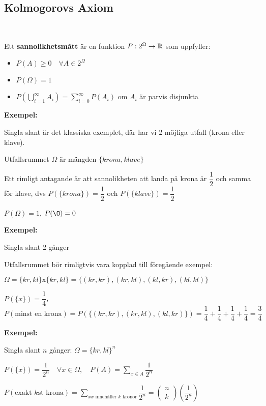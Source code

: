 \subsection{Kolmogorovs Axiom}\hfill\\
\par
\noindent Ett \textbf{sannolikhetsmått} är en funktion $P:2^{\Omega}\to\mathbb{R}$ som uppfyller:
\begin{itemize}
  \item $P(A)\geq0\quad \forall A\in2^{\Omega}$
  \item $P(\Omega) = 1$
  \item $P\left(\bigcup_{i=1}^{\infty}A_i\right) = \sum_{i=0}^{\infty}P(A_i)$ om $A_i$ är parvis disjunkta
\end{itemize}
\par\bigskip
\noindent\textbf{Exempel:}
\par\bigskip
\noindent Singla slant är det klassiska exemplet, där har vi 2 möjliga utfall (krona eller klave).\par
\noindent Utfallsrummet $\Omega$ är mängden $\{krona, klave\}$\par
\noindent Ett rimligt antagande är att sannolikheten att landa på krona är $\dfrac{1}{2}$ och samma för klave, dvs $P(\{krona\}) = \dfrac{1}{2}$ och $P(\{klave\}) = \dfrac{1}{2}$\par\bigskip
\noindent $P(\Omega) = 1$, $P(\O) = 0$
\par\bigskip
\noindent\textbf{Exempel:}
\par\bigskip
\noindent Singla slant 2 gånger\par
\noindent Utfallsrummet bör rimligtvis vara kopplad till föregående exempel:
\par\bigskip
\noindent$\Omega = \{kr,kl\}\text{x}\{kr,kl\} = \{(kr,kr),(kr,kl),(kl,kr),(kl,kl)\}$
\par\bigskip
\noindent $P(\{x\})=\dfrac{1}{4}$, $P(\text{minst en krona}) = P\left(\{(kr,kr),(kr,kl),(kl,kr)\}\right) = \dfrac{1}{4}+\dfrac{1}{4}+\dfrac{1}{4}+\dfrac{1}{4}=\dfrac{3}{4}$
\par\bigskip
\noindent\textbf{Exempel:}
\par\bigskip
\noindent Singla slant $n$ gånger: $\Omega = \{kr,kl\}^n$\par
\noindent $P(\{x\}) = \dfrac{1}{2^n}\quad \forall x\in\Omega,\quad P(A) = \sum_{x\in A}\dfrac{1}{2^n}$\par
\noindent $P(\text{exakt $k$st krona}) = \sum_{x\text{$x$ innehåller $k$ kronor}}\dfrac{1}{2^n} = \begin{pmatrix}n\\k\end{pmatrix}\left(\dfrac{1}{2^n}\right)$
